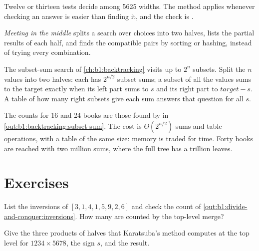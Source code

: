 Twelve or thirteen tests decide among 5625 widths. The method applies whenever checking an answer is easier than
finding it, and the check is .

\begin{definition}\label{def:b1:divide-and-conquer:meet}
\emph{Meeting in the middle} splits a search over choices into two halves, lists the partial
results of each half, and finds the compatible pairs by sorting or hashing, instead of trying every combination.
\end{definition}

The subset-sum search of \cref{ch:b1:backtracking} visits up to $2^n$ subsets. Split the $n$ values into two halves:
each has $2^{n/2}$ subset sums; a subset of all the values sums to the target exactly when its left part sums to $s$ and
its right part to $\mathit{target} - s$. A table of how many right subsets give each sum answers that question for all
$s$.

\label{lst:b1:divide-and-conquer:meet}

\label{out:b1:divide-and-conquer:meet}

The counts for 16 and 24 books are those found by  in \cref{out:b1:backtracking:subset-sum}. The cost is
$\Theta(2^{n/2})$ sums and table operations, with a table of the same size: memory is traded for time. Forty books are
reached with two million sums, where the full tree has a trillion leaves.

\section{Exercises}\label{sec:b1:divide-and-conquer:exercises}

\begin{exercise}[$\star$]\label{exo:b1:divide-and-conquer:1}
List the inversions of $[3, 1, 4, 1, 5, 9, 2, 6]$ and check the count of \cref{out:b1:divide-and-conquer:inversions}.
How many are counted by the top-level merge?
\end{exercise}

\begin{exercise}[$\star$]\label{exo:b1:divide-and-conquer:2}
Give the three products of halves that Karatsuba's method computes at the top level for $1234 \times 5678$, the sign
$s$, and the result.
\end{exercise}

